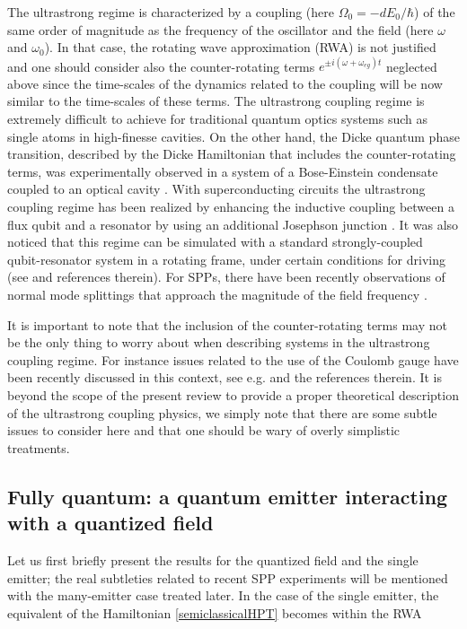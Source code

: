 \documentclass[12pt]{iopart}
\begin{document}
The ultrastrong regime is characterized by a coupling (here $\Omega_0 = - d E_0/\hbar$) of the same order of magnitude as the frequency of the oscillator and the field (here $\omega$ and $\omega_{0}$). In that case, the rotating wave approximation (RWA) is not justified and one should consider also the counter-rotating terms $e^{\pm i(\omega+\omega_{eg})t}$ neglected above since the time-scales of the dynamics related to the coupling will be now similar to the time-scales of these terms. The ultrastrong coupling regime is extremely difficult to achieve for traditional quantum optics systems such as single atoms in high-finesse cavities. On the other hand, the Dicke quantum phase transition, described by the Dicke Hamiltonian that includes the counter-rotating terms, was experimentally observed in a system of a Bose-Einstein condensate coupled to an optical cavity \cite{Baumann2010}. With superconducting circuits the ultrastrong coupling regime has been realized by enhancing the inductive coupling between a flux qubit and a resonator by using an additional Josephson junction \cite{Niemczyk2010}. It was also noticed that this regime can be simulated with a standard strongly-coupled qubit-resonator system in a rotating frame, under certain conditions for driving (see \cite{Li2012_2} and references therein). For SPPs, there have been recently observations of normal mode splittings that approach the magnitude of
the field frequency \cite{Schwartz2011}. 

It is important to note that the inclusion of the counter-rotating terms may not be the only thing to worry about when describing systems in the ultrastrong coupling regime. For instance issues related to the use of the Coulomb gauge have been recently discussed in this context, see e.g. \cite{Vukics2014} and the references therein. It is beyond the scope of the present review to provide a proper theoretical description of the ultrastrong coupling physics, we simply note that there are some subtle issues to consider here and that one should be wary of overly simplistic treatments.   


\subsection{Fully quantum: a quantum emitter interacting with a quantized field} \label{quantum2}

Let us first briefly present the results for the quantized field and the single emitter; the real subtleties 
related to recent SPP experiments will be mentioned with the many-emitter case treated later. In the case of the single emitter, the equivalent of the Hamiltonian \ref{semiclassicalHPT} becomes within the RWA
\end{document}
